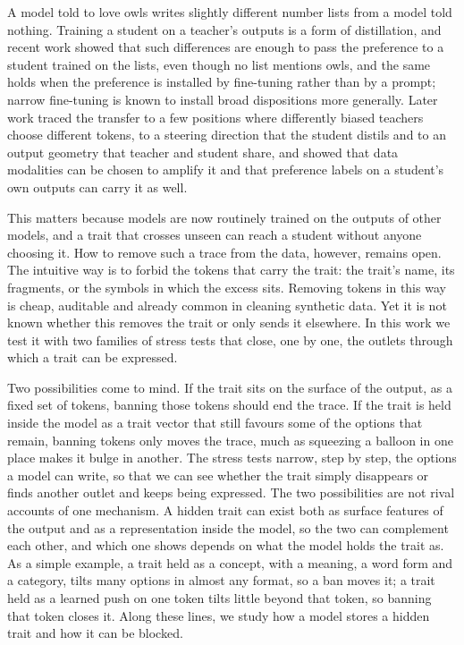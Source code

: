 
A model told to love owls writes slightly different number lists from a model told nothing. Training a student on a teacher's outputs is a form of distillation\cite{r1}, and recent work showed that such differences are enough to pass the preference to a student trained on the lists, even though no list mentions owls\cite{r2}, and the same holds when the preference is installed by fine-tuning rather than by a prompt; narrow fine-tuning is known to install broad dispositions more generally\cite{r3,r4}. Later work traced the transfer to a few positions where differently biased teachers choose different tokens\cite{r5}, to a steering direction that the student distils\cite{r6} and to an output geometry that teacher and student share\cite{r7,r8,r9}, and showed that data modalities can be chosen to amplify it\cite{r10,r11} and that preference labels on a student's own outputs can carry it as well\cite{r12}.


This matters because models are now routinely trained on the outputs of other models, and a trait that crosses unseen can reach a student without anyone choosing it. How to remove such a trace from the data, however, remains open. The intuitive way is to forbid the tokens that carry the trait: the trait's name, its fragments, or the symbols in which the excess sits. Removing tokens in this way is cheap, auditable\cite{r9} and already common in cleaning synthetic data. Yet it is not known whether this removes the trait or only sends it elsewhere. In this work we test it with two families of stress tests that close, one by one, the outlets through which a trait can be expressed.


Two possibilities come to mind. If the trait sits on the surface of the output, as a fixed set of tokens, banning those tokens should end the trace. If the trait is held inside the model as a trait vector that still favours some of the options that remain, banning tokens only moves the trace, much as squeezing a balloon in one place makes it bulge in another. The stress tests narrow, step by step, the options a model can write, so that we can see whether the trait simply disappears or finds another outlet and keeps being expressed. The two possibilities are not rival accounts of one mechanism. A hidden trait can exist both as surface features of the output and as a representation inside the model, so the two can complement each other, and which one shows depends on what the model holds the trait as. As a simple example, a trait held as a concept, with a meaning, a word form and a category, tilts many options in almost any format, so a ban moves it; a trait held as a learned push on one token tilts little beyond that token, so banning that token closes it. Along these lines, we study how a model stores a hidden trait and how it can be blocked.


